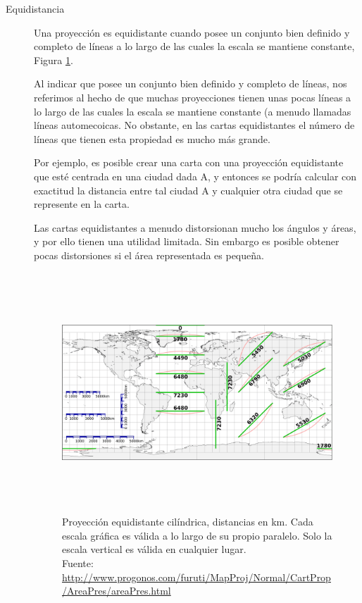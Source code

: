 \begin{description}
\item[Equidistancia] Una proyección es equidistante cuando posee un conjunto bien definido y completo de líneas a lo largo de las cuales la escala se mantiene constante, Figura \ref{fig:proyeccion.equidistante}.

Al indicar que posee un conjunto bien definido y completo de líneas, nos referimos al hecho de que muchas proyecciones tienen unas pocas líneas a lo largo de las cuales la escala se mantiene constante (a menudo llamadas líneas automecoicas. No obstante, en las cartas equidistantes el número de líneas que tienen esta propiedad es mucho más grande.

Por ejemplo, es posible crear una carta con una proyección equidistante que esté centrada en una ciudad dada A, y entonces se podría calcular con exactitud la distancia entre tal ciudad A y cualquier otra ciudad que se represente en la carta.

Las cartas equidistantes a menudo distorsionan mucho los ángulos y áreas, y por ello tienen una utilidad limitada. Sin embargo es posible obtener pocas distorsiones si el área representada es pequeña. 

    \begin{figure}[!h]
      \centering
  \includegraphics[height=9cm]{./Imagenes/06.00.navegacion/proyeccion-equidistante.png}
      \caption{Proyecci\'on equidistante cil\'indrica, distancias en km. Cada escala gr\'afica es v\'alida a lo largo de su propio paralelo. Solo la escala vertical es v\'alida en cualquier lugar.\\{\footnotesize Fuente: \url{http://www.progonos.com/furuti/MapProj/Normal/CartProp/AreaPres/areaPres.html}}}
      \label{fig:proyeccion.equidistante}
    \end{figure}



\end{description}
